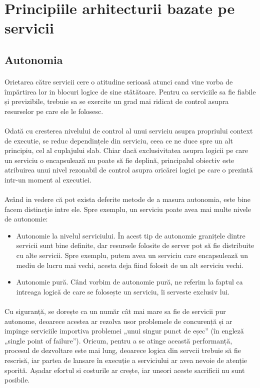 \documentclass[12pt]{report}
\begin{document}
  	\section{Principiile arhitecturii bazate pe servicii}
  	\subsection{Autonomia}
  	\paragraph{}Orietarea către servicii cere o atitudine serioasă atunci cand vine vorba de împărtirea lor in blocuri logice de sine stătătoare. Pentru ca serviciile sa fie fiabile și previzibile, trebuie sa se exercite un grad mai ridicat de control asupra resurselor pe care ele le folosesc.
  	\paragraph{}Odată cu cresterea nivelului de control al unui serviciu asupra propriului context de executie, se reduc dependințele din serviciu, ceea ce ne duce spre un alt principiu, cel al cuplajului slab. Chiar dacă exclusivitatea asupra logicii pe care un serviciu o encapsulează nu poate să fie deplină, principalul obiectiv este atribuirea unui nivel rezonabil de control asupra oricărei logici pe care o prezintă intr-un moment al executiei.
  	\paragraph{}Având in vedere că pot exista deferite metode de a masura autonomia, este bine facem distincție intre ele. Spre exemplu, un serviciu poate avea mai multe nivele de autonomie:
    \begin{itemize}
    \item Autonomie la nivelul serviciului. În acest tip de autonomie granițele dintre servicii sunt bine definite, dar resursele folosite de server pot să fie distribuite cu alte servicii. Spre exemplu, putem avea un serviciu care encapsulează un mediu de lucru mai vechi, acesta deja fiind folosit de un alt serviciu vechi.
    \item Autonomie pură. Când vorbim de autonomie pură, ne referim la faptul ca intreaga logică de care se folosește un serviciu, îi serveste exclusiv lui. 
    \end{itemize}
    \paragraph{}Cu siguranță, se dorește ca un număr cât mai mare sa fie de servicii pur autonome, deoarece acestea ar rezolva usor problemele de concurență și ar impinge serviciile importiva problemei „unui singur punct de eșec” (în engleză „single point of failure”). Oricum, pentru a se atinge această performanță, procesul de dezvoltare este mai lung, deoarece logica din servcii trebuie să fie rescrisă, iar partea de lansare în execuție a serviciului ar avea nevoie de atenție sporită. Așadar efortul si costurile ar crește, iar uneori aceste sacrificii nu sunt posibile.
\end{document}
